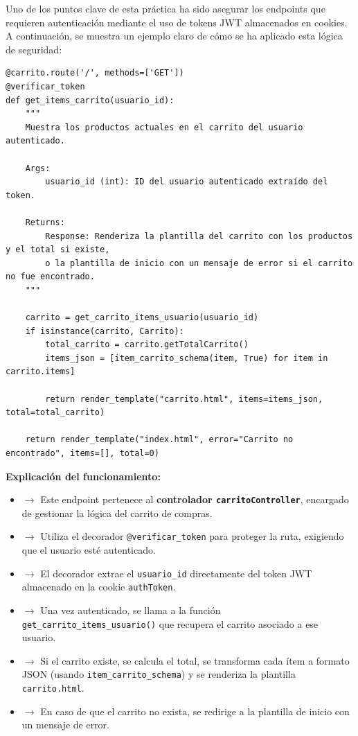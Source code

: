 \documentclass[10pt]{book}
\begin{document}
Uno de los puntos clave de esta práctica ha sido asegurar los endpoints que requieren autenticación mediante el uso de tokens JWT almacenados en cookies. A continuación, se muestra un ejemplo claro de cómo se ha aplicado esta lógica de seguridad:

\begin{lstlisting}[style=pythonclean, caption={Endpoint protegido para mostrar el carrito}]
@carrito.route('/', methods=['GET'])
@verificar_token
def get_items_carrito(usuario_id):
    """
    Muestra los productos actuales en el carrito del usuario autenticado.

    Args:
        usuario_id (int): ID del usuario autenticado extraído del token.

    Returns:
        Response: Renderiza la plantilla del carrito con los productos y el total si existe,
        o la plantilla de inicio con un mensaje de error si el carrito no fue encontrado.
    """

    carrito = get_carrito_items_usuario(usuario_id)
    if isinstance(carrito, Carrito):
        total_carrito = carrito.getTotalCarrito()
        items_json = [item_carrito_schema(item, True) for item in carrito.items]
        
        return render_template("carrito.html", items=items_json, total=total_carrito)

    return render_template("index.html", error="Carrito no encontrado", items=[], total=0)
\end{lstlisting}

\textbf{Explicación del funcionamiento:}
\begin{itemize}
    \item $\rightarrow$ Este endpoint pertenece al \textbf{controlador \texttt{carritoController}}, encargado de gestionar la lógica del carrito de compras.
    \item $\rightarrow$ Utiliza el decorador \texttt{@verificar\_token} para proteger la ruta, exigiendo que el usuario esté autenticado.
    \item $\rightarrow$ El decorador extrae el \texttt{usuario\_id} directamente del token JWT almacenado en la cookie \texttt{authToken}.
    \item $\rightarrow$ Una vez autenticado, se llama a la función \texttt{get\_carrito\_items\_usuario()} que recupera el carrito asociado a ese usuario.
    \item $\rightarrow$ Si el carrito existe, se calcula el total, se transforma cada ítem a formato JSON (usando \texttt{item\_carrito\_schema}) y se renderiza la plantilla \texttt{carrito.html}.
    \item $\rightarrow$ En caso de que el carrito no exista, se redirige a la plantilla de inicio con un mensaje de error.
\end{itemize}
\end{document}
